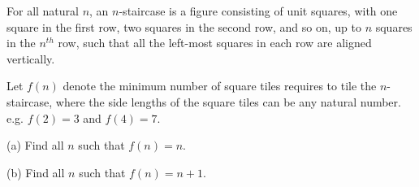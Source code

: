 For all natural $n$,  an $n$-staircase is a figure consisting of unit squares, with one square in the first row, two squares in the second row, and so on, up to $n$ squares in the $n^{th}$ row, such that all the left-most squares in each row are aligned vertically.

Let $f(n)$ denote the minimum number of square tiles requires to tile the $n$-staircase, where the side lengths of the square tiles can be any natural number. e.g. $f(2)=3$ and $f(4)=7$.

(a) Find all $n$ such that $f(n)=n$.

(b) Find all $n$ such that $f(n) = n+1$.